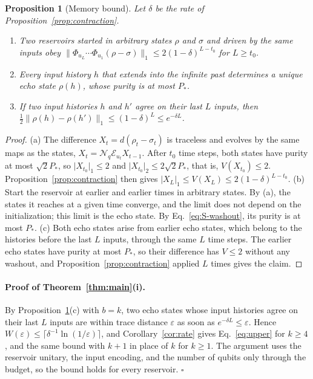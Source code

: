 \documentclass[aps,prl,twocolumn,superscriptaddress,floatfix]{revtex4-2}
\theoremstyle{plain}
\newtheorem{proposition}[lemma]{Proposition}
\newcommand{\nrm}[2]{\lvert #1\rvert_{#2}}
\newcommand{\Norm}[1]{\lVert #1\rVert}
\newcommand{\cE}{\mathcal E}
\newcommand{\Nq}{\mathcal N_q}
\begin{document}
\begin{proposition}[Memory bound]\label{prop:echo}
Let $\delta$ be the rate of Proposition~\ref{prop:contraction}.
\begin{enumerate}
\item[(a)] Two reservoirs started in arbitrary states $\rho$ and $\sigma$ and driven by the same inputs obey $\Norm{\Phi_{u_L}\cdots\Phi_{u_1}(\rho-\sigma)}_1\le2(1-\delta)^{L-t_0}$ for $L\ge t_0$.
\item[(b)] Every input history $h$ that extends into the infinite past determines a unique echo state $\rho(h)$, whose purity is at most $P_*$.
\item[(c)] If two input histories $h$ and $h'$ agree on their last $L$ inputs, then $\frac12\Norm{\rho(h)-\rho(h')}_1\le(1-\delta)^L\le e^{-\delta L}$.
\end{enumerate}
\end{proposition}

\begin{proof}
(a) The difference $X_t=d(\rho_t-\sigma_t)$ is traceless and evolves by the same maps as the states, $X_t=\Nq\cE_{u_t}X_{t-1}$. After $t_0$ time steps, both states have purity at most $\sqrt2P_*$, so $\nrm{X_{t_0}}1\le2$ and $\nrm{X_{t_0}}2\le2\sqrt2P_*$, that is, $V(X_{t_0})\le2$. Proposition~\ref{prop:contraction} then gives $\nrm{X_L}1\le V(X_L)\le2(1-\delta)^{L-t_0}$.
(b) Start the reservoir at earlier and earlier times in arbitrary states. By (a), the states it reaches at a given time converge, and the limit does not depend on the initialization; this limit is the echo state. By Eq.~\eqref{eq:S-washout}, its purity is at most $P_*$.
(c) Both echo states arise from earlier echo states, which belong to the histories before the last $L$ inputs, through the same $L$ time steps. The earlier echo states have purity at most $P_*$, so their difference has $V\le2$ without any washout, and Proposition~\ref{prop:contraction} applied $L$ times gives the claim.
\end{proof}

\paragraph*{Proof of Theorem~\ref{thm:main}(i).} By Proposition~\ref{prop:echo}(c) with $b=k$, two echo states whose input histories agree on their last $L$ inputs are within trace distance $\varepsilon$ as soon as $e^{-\delta L}\le\varepsilon$. Hence $W(\varepsilon)\le\lceil\delta^{-1}\ln(1/\varepsilon)\rceil$, and Corollary~\ref{cor:rate} gives Eq.~\eqref{eq:upper} for $k\ge4$, and the same bound with $k+1$ in place of $k$ for $k\ge1$. The argument uses the reservoir unitary, the input encoding, and the number of qubits only through the budget, so the bound holds for every reservoir. \hfill$\square$
\end{document}
